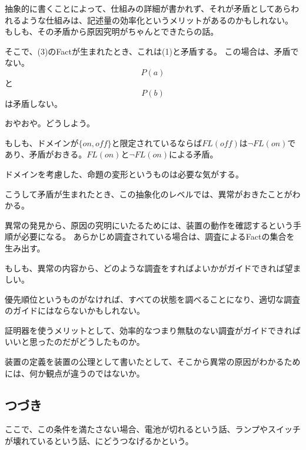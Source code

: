 \documentclass[10pt, oneside]{jarticle}   	%
\theoremstyle{definition}
\begin{document}
抽象的に書くことによって、仕組みの詳細が書かれず、それが矛盾としてあらわれるような仕組みは、記述量の効率化というメリットがあるのかもしれない。
もしも、その矛盾から原因究明がちゃんとできたらの話。


そこで、(3)のFactが生まれたとき、これは(1)と矛盾する。
この場合は、矛盾でない。
$$P(a)$$と$$P(b)$$は矛盾しない。

おやおや。どうしよう。

もしも、ドメインが$\{on, off\}$と限定されているならば$FL(off)$は$\neg FL(on)$であり、矛盾がおきる。$FL(on)$と$\neg FL(on)$による矛盾。

ドメインを考慮した、命題の変形というものは必要な気がする。

こうして矛盾が生まれたとき、この抽象化のレベルでは、異常がおきたことがわかる。

異常の発見から、原因の究明にいたるためには、装置の動作を確認するという手順が必要になる。
あらかじめ調査されている場合は、調査によるFactの集合を生み出す。

もしも、異常の内容から、どのような調査をすればよいかがガイドできれば望ましい。

優先順位というものがなければ、すべての状態を調べることになり、適切な調査のガイドにはならないかもしれない。

証明器を使うメリットとして、効率的なつまり無駄のない調査がガイドできればいいと思ったのだがどうしたものか。

装置の定義を装置の公理として書いたとして、そこから異常の原因がわかるためには、何か観点が違うのではないか。



\subsection{つづき}

ここで、この条件を満たさない場合、電池が切れるという話、ランプやスイッチが壊れているという話、にどうつなげるかという。
\end{document}
